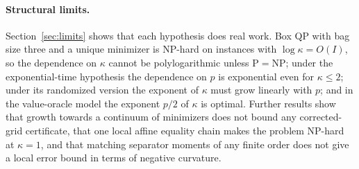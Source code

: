 \paragraph{Structural limits.}
Section~\ref{sec:limits} shows that each hypothesis does real work. Box QP with
bag size three and a unique minimizer is NP-hard on instances with
$\log\kappa=O(I)$, so the dependence on $\kappa$ cannot be polylogarithmic unless
P${}={}$NP; under the exponential-time hypothesis the dependence on $p$ is
exponential even for $\kappa\le2$; under its randomized version the exponent of
$\kappa$ must grow linearly with $p$; and in the value-oracle model the
exponent $p/2$ of $\kappa$ is optimal. Further results show that growth towards
a continuum of minimizers does not bound any corrected-grid certificate, that
one local affine equality chain makes the problem NP-hard at $\kappa=1$, and
that matching separator moments of any finite order does not give a local
error bound in terms of negative curvature.

